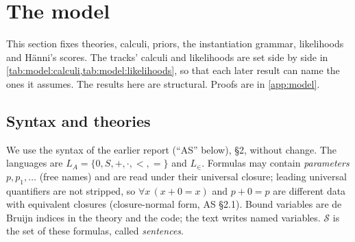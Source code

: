 \section{The model}\label{sec:model}

This section fixes theories, calculi, priors, the instantiation grammar, likelihoods and H\"anni's scores. The tracks' calculi and likelihoods are set side by side in \cref{tab:model:calculi,tab:model:likelihoods}, so that each later result can name the ones it assumes. The results here are structural. Proofs are in \cref{app:model}.

\subsection{Syntax and theories}\label{sec:model:syntax}

We use the syntax of the earlier report \citet{claude2026axiomschemas} (``AS'' below), \S2, without change. The languages are $L_A=\{0,S,+,\cdot,<,=\}$ and $L_\in$. Formulas may contain \emph{parameters} $p,p_1,\dots$ (free names) and are read under their universal closure; leading universal quantifiers are not stripped, so $\forall x\,(x+0=x)$ and $p+0=p$ are different data with equivalent closures (closure-normal form, AS \S2.1). Bound variables are de Bruijn indices in the theory and the code; the text writes named variables. $\mathcal S$ is the set of these formulas, called \emph{sentences}.

